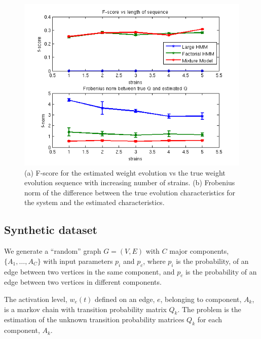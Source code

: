 \documentclass{bioinfo}
\begin{document}
\begin{figure}[h]
  \centering
  \includegraphics[scale=0.6]{results/mm_strain}
  \caption{(a) F-score for the estimated weight evolution vs the true
    weight evolution sequence with increasing number of strains. (b)
    Frobenius norm of the difference between the true evolution
    characteristics for the system and the estimated characteristics. } 
  \label{fig:validation-s}
\end{figure}


\subsection{Synthetic dataset}
\label{sec:synthetic-dataset}
We generate a ``random'' graph $G=(V, E)$ with $C$ major components,
$\{A_1,\ldots, A_C\}$ with input parameters $p_{i}$ and $p_{c}$,
where $p_{i}$ is the probability, of an edge between two vertices in
the same component,  and $p_c$ is the probability of an edge between
two vertices in different components.  

The activation level, $w_e(t)$ defined on an edge, $e$, belonging to
component, $A_k$, is a markov chain with transition probability matrix
$Q_{k}$. The problem is the estimation of the unknown transition probability
matrices $Q_k$ for each component, $A_k$. 
\end{document}
